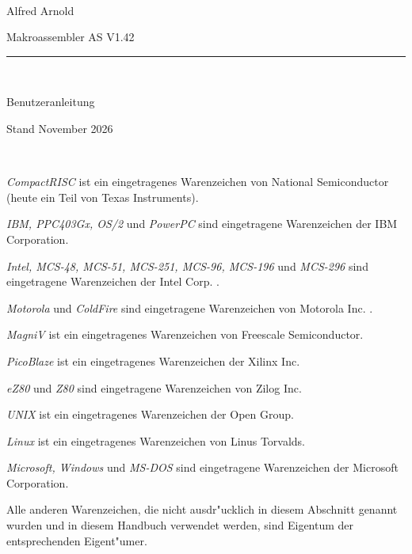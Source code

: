 \documentclass[12pt,a4paper,twoside]{report}
\newcommand{\asname}{AS}
\begin{document}
\thispagestyle{empty}

\
\vspace{7cm}\par

\begin{raggedright}
{\large Alfred Arnold}\\
\vspace{1cm}\par
{\huge Makroassembler \asname{} V1.42}\\
\rule{14cm}{0.3mm}\\
\vspace{2mm}\par
{\huge Benutzeranleitung}

\vspace{1cm}\par

{\large Stand November 2026}
\end{raggedright}

\clearpage
\thispagestyle{empty}

\ \vspace{4cm}

{\em CompactRISC} ist ein eingetragenes Warenzeichen von National
 Semiconductor (heute ein Teil von Texas Instruments).

{\em IBM, PPC403Gx, OS/2} und {\em PowerPC} sind eingetragene Warenzeichen
der IBM Corporation.

{\em Intel, MCS-48, MCS-51, MCS-251, MCS-96, MCS-196} und {\em MCS-296}
sind eingetragene Warenzeichen der Intel Corp. .

{\em Motorola} und {\em ColdFire} sind eingetragene Warenzeichen von
Motorola Inc. .

{\em MagniV} ist ein eingetragenes Warenzeichen von Freescale Semiconductor.

{\em PicoBlaze} ist ein eingetragenes Warenzeichen der Xilinx Inc.

{\em eZ80} und {\em Z80} sind eingetragene Warenzeichen von Zilog Inc.

{\em UNIX} ist ein eingetragenes Warenzeichen der Open Group.

{\em Linux} ist ein eingetragenes Warenzeichen von Linus Torvalds.

{\em Microsoft, Windows} und {\em MS-DOS} sind eingetragene Warenzeichen
der Microsoft Corporation.

Alle anderen Warenzeichen, die nicht ausdr"ucklich in diesem Abschnitt
genannt wurden und in diesem Handbuch verwendet werden, sind Eigentum
der entsprechenden Eigent"umer.
\end{document}
